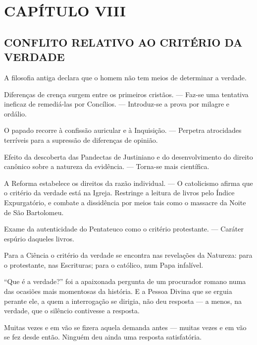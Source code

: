 \documentclass[11pt,a5paper,twoside,openany]{book}
\begin{document}
\clearpage
\chapter*{CAPÍTULO VIII}
\section*{CONFLITO RELATIVO AO CRITÉRIO DA VERDADE}
A filosofia antiga declara que o homem não tem meios de determinar a verdade.

Diferenças de crença surgem entre os primeiros cristãos. — Faz-se uma tentativa ineficaz de remediá-las por Concílios. — Introduz-se a prova por milagre e ordálio.

O papado recorre à confissão auricular e à Inquisição. — Perpetra atrocidades terríveis para a supressão de diferenças de opinião.

Efeito da descoberta das Pandectas de Justiniano e do desenvolvimento do direito canônico sobre a natureza da evidência. — Torna-se mais científica.

A Reforma estabelece os direitos da razão individual. — O catolicismo afirma que o critério da verdade está na Igreja. Restringe a leitura de livros pelo Índice Expurgatório, e combate a dissidência por meios tais como o massacre da Noite de São Bartolomeu.

Exame da autenticidade do Pentateuco como o critério protestante. — Caráter espúrio daqueles livros.

Para a Ciência o critério da verdade se encontra nas revelações da Natureza: para o protestante, nas Escrituras; para o católico, num Papa infalível.

“Que é a verdade?” foi a apaixonada pergunta de um procurador romano numa das ocasiões mais momentosas da história. E a Pessoa Divina que se erguia perante ele, a quem a interrogação se dirigia, não deu resposta — a menos, na verdade, que o silêncio contivesse a resposta.

Muitas vezes e em vão se fizera aquela demanda antes — muitas vezes e em vão se fez desde então. Ninguém deu ainda uma resposta satisfatória.
\end{document}
